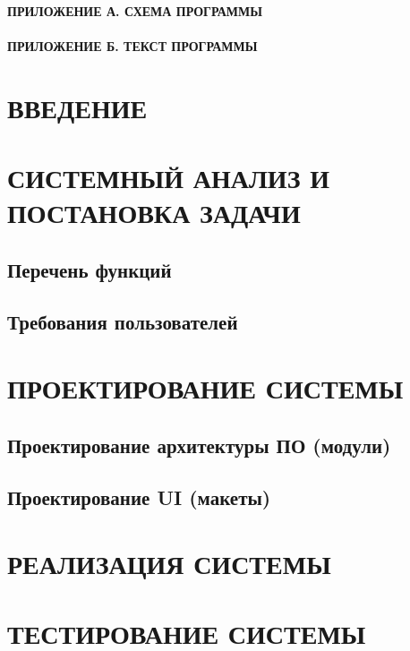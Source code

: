 \documentclass[12pt, a4paper, simple]{eskdtext}
\begin{document}
    

    \tableofcontents                                
    \paragraph{ПРИЛОЖЕНИЕ А. СХЕМА ПРОГРАММЫ}
    \paragraph{ПРИЛОЖЕНИЕ Б. ТЕКСТ ПРОГРАММЫ}
    \newpage

    \newpage
    \section*{ВВЕДЕНИЕ}
    \newpage

    \section{СИСТЕМНЫЙ АНАЛИЗ И ПОСТАНОВКА ЗАДАЧИ}
    \subsection{Перечень функций}
    \subsection{Требования пользователей}
    \newpage

    \section{ПРОЕКТИРОВАНИЕ СИСТЕМЫ}
    \subsection{Проектирование архитектуры ПО (модули)}
    \subsection{Проектирование UI (макеты)}
    \newpage

    \section{РЕАЛИЗАЦИЯ СИСТЕМЫ}
    \newpage

    \section{ТЕСТИРОВАНИЕ СИСТЕМЫ}
    \newpage
\end{document}

